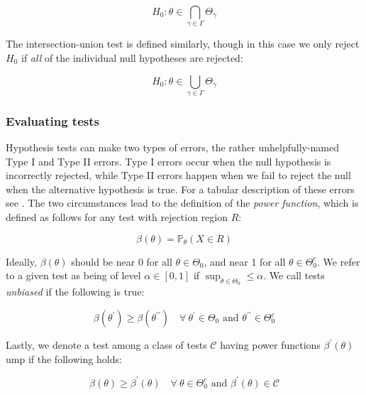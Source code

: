 \documentclass{report}
\begin{document}
\begin{equation}\label{eq:union-intersection-test}
    H_0 \colon \theta \in \bigcap_{\gamma \in \Gamma} \Theta_\gamma 
\end{equation}

The intersection-union test is defined similarly, though in this case we only reject $H_0$ if \textit{all} of the individual null hypotheses are rejected: 

\begin{equation}\label{eq:intersection-union-test}
    H_0 \colon \theta \in \bigcup_{\gamma \in \Gamma} \Theta_\gamma 
\end{equation}

\subsubsection{Evaluating tests}

Hypothesis tests can make two types of errors, the rather unhelpfully-named Type I and Type II errors. Type I errors occur when the null hypothesis is incorrectly rejected, while Type II errors happen when we fail to reject the null when the alternative hypothesis is true. For a tabular description of these errors see \cite[Chapter~8.3.1]{casella_statistical_2002}. The two circumstances lead to the definition of the \textit{power function}, which is defined as follows for any test with rejection region $R$:

\begin{equation}\label{eq:power-function}
    \beta(\theta) = \mathbb{P}_\theta(X \in R)
\end{equation}

Ideally, $\beta(\theta)$ should be near 0 for all $\theta \in \Theta_0$, and near 1 for all $\theta \in \Theta_0^c$.  We refer to a given test as being of level $\alpha \in [0, 1]$ if $\sup_{\theta \in \Theta_0} \leq \alpha$. We call tests \textit{unbiased} if the following is true:

\begin{equation}\label{eq:unbiased-hypothesis-test}
    \beta(\theta^\prime) \geq \beta(\theta^{\prime\prime}) \quad \forall \: \theta^\prime \in \Theta_0 \text{ and } \theta^{\prime\prime} \in \Theta_0^c
\end{equation}

Lastly, we denote a test among a class of tests $\mathcal{C}$ having power functions $\beta^\prime(\theta)$ \gls{ump} if the following holds:

\begin{equation}\label{eq:ump-hypothesis-test}
    \beta(\theta) \geq \beta^\prime(\theta) \quad \forall \: \theta \in \Theta_0^c \text{ and } \beta^\prime(\theta) \in \mathcal{C}
\end{equation}
\end{document}
